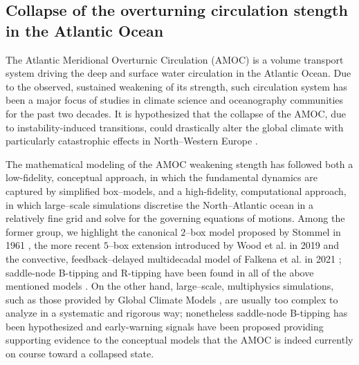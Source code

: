 \documentclass[openacc]{rsproca_new}
\begin{document}
\subsection{Collapse of the overturning circulation stength in the Atlantic Ocean}\label{subsec:amoc}

The Atlantic Meridional Overturnic Circulation (AMOC) is a volume transport system driving the deep and surface water circulation in the Atlantic Ocean. 
Due to the observed, sustained weakening of its strength, such circulation system has been a major focus of studies in climate science and oceanography communities for the past two decades.
It is hypothesized that the collapse of the AMOC, due to instability-induced transitions, could drastically alter the global climate with particularly catastrophic effects in North--Western Europe \cite{Dijkstra2026}.

The mathematical modeling of the AMOC weakening stength has followed both a low-fidelity, conceptual approach, in which the fundamental dynamics are captured by simplified box--models, and a high-fidelity, computational approach, in which large--scale simulations discretise the North--Atlantic ocean in a relatively fine grid and solve for the governing equations of motions.
Among the former group, we highlight the canonical $2$--box model proposed by Stommel in 1961 \cite{Stommel1961}, the more recent $5$--box extension introduced by Wood et al. in 2019 \cite{Wood2019} and the convective, feedback--delayed multidecadal model of Falkena et al. in 2021 \cite{Falkena2021}; saddle-node B-tipping and R-tipping have been found in all of the above mentioned models \cite{Alkhayuon2019,Lohmann2025a,Mancini2026}.
On the other hand, large--scale, multiphysics simulations, such as those provided by Global Climate Models \cite{vanWesten2023}, are usually too complex to analyze in a systematic and rigorous way; nonetheless saddle-node B-tipping has been hypothesized \cite{vanWesten2025} and early-warning signals have been proposed \cite{vanWesten2024,Smolders2025} providing supporting evidence to the conceptual models that the AMOC is indeed currently on course toward a collapsed state.
\end{document}
